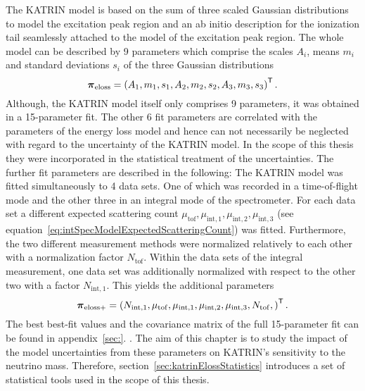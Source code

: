 The KATRIN model is based on the sum of three scaled Gaussian distributions to model the excitation peak region and an ab initio description for the ionization tail seamlessly attached to the model of the excitation peak region. The whole model can be described by 9 parameters which comprise the scales $A_i$, means $m_i$ and standard deviations $s_i$ of the three Gaussian distributions
\begin{equation}
	\boldsymbol{\mathbf{\pi}}_\mathrm{eloss} = 
	{\left(
	A_1, m_1, s_1, 
	A_2, m_2, s_2, 
	A_3, m_3, s_3
	\right)}^{\mathsf{T}}
	\text{\,.}
\end{equation}
Although, the KATRIN model itself only comprises 9 parameters, it was obtained in a 15-parameter fit. The other 6 fit parameters are correlated with the parameters of the energy loss model and hence can not necessarily be neglected with regard to the uncertainty of the KATRIN model. In the scope of this thesis they were incorporated in the statistical treatment of the uncertainties. The further fit parameters are described in the following: The KATRIN model was fitted simultaneously to 4 data sets. One of which was recorded in a time-of-flight mode and the other three in an integral mode of the spectrometer.  For each data set a different expected scattering count $\mu_\mathrm{tof}, \mu_{\mathrm{int},1}, \mu_{\mathrm{int},2}, \mu_{\mathrm{int},3}$ (see equation~\eqref{eq:intSpecModelExpectedScatteringCount}) was fitted. Furthermore, the two different measurement methods were normalized relatively to each other with a normalization factor $N_\mathrm{tof}$. Within the data sets of the integral measurement, one data set was additionally normalized with respect to the other two with a factor $N_{\mathrm{int},1}$. This yields the additional parameters
\begin{equation}
	\boldsymbol{\mathbf{\pi}}_\mathrm{eloss+} = 
	{\left(
		N_{\mathrm{int},1},
		\mu_\mathrm{tof},
		\mu_{\mathrm{int},1}, 
		\mu_{\mathrm{int},2}, 
		\mu_{\mathrm{int},3},
		N_\mathrm{tof},
		\right)}^{\mathsf{T}}
	\text{\,.}
\end{equation}
The best best-fit values and the covariance matrix of the full 15-parameter fit can be found in appendix~\ref{sec:}. . The aim of this chapter is to study the impact of the model uncertainties from these parameters on KATRIN's sensitivity to the neutrino mass. Therefore, section~\ref{sec:katrinElossStatistics} introduces a set of statistical tools used in the scope of this thesis.

